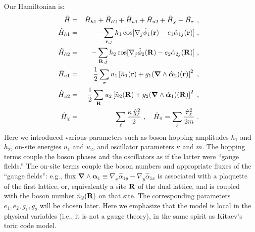 Our Hamiltonian is:
\begin{eqnarray}
\label{H}
\hat{H} &=& \hat{H}_{h1} + \hat{H}_{h2} + \hat{H}_{u1} + \hat{H}_{u2} + \hat{H}_\chi + \hat{H}_\pi ~,\\
\hat{H}_{h1} &=& -\sum_{{\bf r}, j} h_1 \cos[\nabla_j \hat{\phi}_1({\bf r}) - e_1 \hat{\alpha}_{1j}({\bf r})] ~,\\
\hat{H}_{h2} &=& -\sum_{{\bf R}, j} h_2 \cos[\nabla_j \hat{\phi}_2({\bf R}) - e_2 \hat{\alpha}_{2j}({\bf R})] ~,\\
\hat{H}_{u1} &=& \frac{1}{2} \sum_{\bf r} u_1 \left[\hat{n}_1({\bf r}) + g_1 ({\bm \nabla} \wedge \hat{\bm \alpha}_2)({\bf r}) \right]^2 ~,\\
\hat{H}_{u2} &=& \frac{1}{2} \sum_{\bf R} u_2 \left[\hat{n}_2({\bf R}) + g_2 ({\bm \nabla} \wedge \hat{\bm \alpha}_1)({\bf R}) \right]^2 ~,\\
\hat{H}_\chi &=& \sum_\ell \frac{\kappa\, \hat{\chi}_\ell^2}{2} ~, \quad
\hat{H}_\pi = \sum_\ell \frac{\hat{\pi}_\ell^2}{2m} ~.
\end{eqnarray}
Here we introduced various parameters such as boson hopping amplitudes $h_1$ and $h_2$, on-site energies $u_1$ and $u_2$, and oscillator parameters $\kappa$ and $m$.  The hopping terms couple the boson phases and the oscillators as if the latter were ``gauge fields.''  The on-site terms couple the boson numbers and appropriate fluxes of the ``gauge fields'': e.g., flux ${\bm \nabla} \wedge \hat{\bm \alpha}_1 \equiv \nabla_x \hat{\alpha}_{1y} - \nabla_y \hat{\alpha}_{1x}$ is associated with a plaquette of the first lattice, or, equivalently a site ${\bf R}$ of the dual lattice, and is coupled with the boson number $\hat{n}_2({\bf R})$ on that site.  The corresponding parameters $e_1, e_2, g_1, g_2$ will be chosen later. 
Here we emphasize that the model is local in the physical variables (i.e., it is not a gauge theory), in the same spirit as Kitaev's toric code model.

